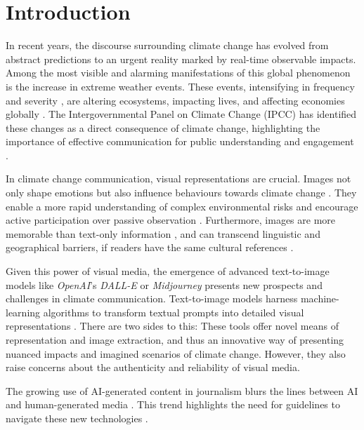 \section{Introduction}

In recent years, the discourse surrounding climate change has evolved from abstract predictions to an urgent reality marked by real-time observable impacts. Among the most visible and alarming manifestations of this global phenomenon is the increase in extreme weather events. These events, intensifying in frequency and severity \parencite{ipcc2023_wg1_11}, are altering ecosystems, impacting lives, and affecting economies globally \parencite[2460]{ipcc2023_wg2_16}. The Intergovernmental Panel on Climate Change (IPCC) has identified these changes as a direct consequence of climate change, highlighting the importance of effective communication for public understanding and engagement \parencite{ipcc2023_wg1_1}.

In climate change communication, visual representations are crucial. Images not only shape emotions but also influence behaviours towards climate change \parencite{Leiserowitz2006}. They enable a more rapid understanding of complex environmental risks \parencite{Epstein1994, Joffe2008} and encourage active participation over passive observation \parencite{Keib2018}. Furthermore, images are more memorable than text-only information \parencite{Coleman2009, Graber1990}, and can transcend linguistic and geographical barriers, if readers have the same cultural references \parencite{Armfield2013}.

Given this power of visual media, the emergence of advanced text-to-image models like \textit{OpenAI}’s \textit{DALL-E} or \textit{Midjourney} presents new prospects and challenges in climate communication. Text-to-image models harness machine-learning algorithms to transform textual prompts into detailed visual representations \parencite{Zhang2023}. There are two sides to this: These tools offer novel means of representation and image extraction, and thus an innovative way of presenting nuanced impacts and imagined scenarios of climate change. However, they also raise concerns about the authenticity and reliability of visual media.

The growing use of AI-generated content in journalism blurs the lines between AI and human-generated media \parencite{Henrich2023, Kim2023}. This trend highlights the need for guidelines to navigate these new technologies \parencite{CouncilOfEurope2023, SwissPressCouncil2023}.


